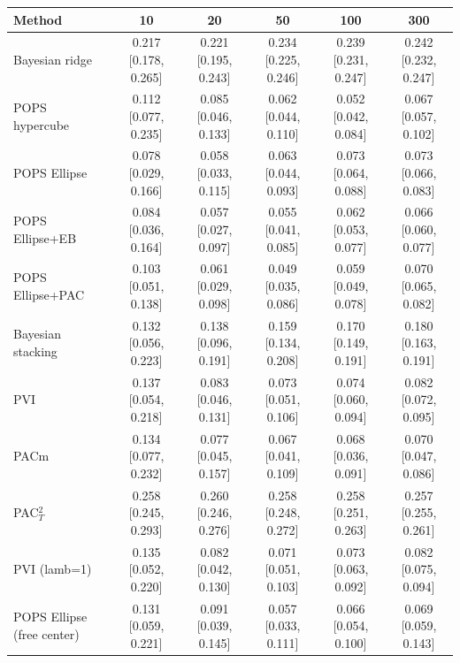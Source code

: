 \begin{tabular}{lccccc}
\toprule
Method & 10 & 20 & 50 & 100 & 300 \\
\midrule
Bayesian ridge & 0.217 {\scriptsize[0.178, 0.265]} & 0.221 {\scriptsize[0.195, 0.243]} & 0.234 {\scriptsize[0.225, 0.246]} & 0.239 {\scriptsize[0.231, 0.247]} & 0.242 {\scriptsize[0.232, 0.247]} \\
POPS hypercube & 0.112 {\scriptsize[0.077, 0.235]} & 0.085 {\scriptsize[0.046, 0.133]} & 0.062 {\scriptsize[0.044, 0.110]} & 0.052 {\scriptsize[0.042, 0.084]} & 0.067 {\scriptsize[0.057, 0.102]} \\
POPS Ellipse & 0.078 {\scriptsize[0.029, 0.166]} & 0.058 {\scriptsize[0.033, 0.115]} & 0.063 {\scriptsize[0.044, 0.093]} & 0.073 {\scriptsize[0.064, 0.088]} & 0.073 {\scriptsize[0.066, 0.083]} \\
POPS Ellipse+EB & 0.084 {\scriptsize[0.036, 0.164]} & 0.057 {\scriptsize[0.027, 0.097]} & 0.055 {\scriptsize[0.041, 0.085]} & 0.062 {\scriptsize[0.053, 0.077]} & 0.066 {\scriptsize[0.060, 0.077]} \\
POPS Ellipse+PAC & 0.103 {\scriptsize[0.051, 0.138]} & 0.061 {\scriptsize[0.029, 0.098]} & 0.049 {\scriptsize[0.035, 0.086]} & 0.059 {\scriptsize[0.049, 0.078]} & 0.070 {\scriptsize[0.065, 0.082]} \\
Bayesian stacking & 0.132 {\scriptsize[0.056, 0.223]} & 0.138 {\scriptsize[0.096, 0.191]} & 0.159 {\scriptsize[0.134, 0.208]} & 0.170 {\scriptsize[0.149, 0.191]} & 0.180 {\scriptsize[0.163, 0.191]} \\
PVI & 0.137 {\scriptsize[0.054, 0.218]} & 0.083 {\scriptsize[0.046, 0.131]} & 0.073 {\scriptsize[0.051, 0.106]} & 0.074 {\scriptsize[0.060, 0.094]} & 0.082 {\scriptsize[0.072, 0.095]} \\
PACm & 0.134 {\scriptsize[0.077, 0.232]} & 0.077 {\scriptsize[0.045, 0.157]} & 0.067 {\scriptsize[0.041, 0.109]} & 0.068 {\scriptsize[0.036, 0.091]} & 0.070 {\scriptsize[0.047, 0.086]} \\
PAC$^2_T$ & 0.258 {\scriptsize[0.245, 0.293]} & 0.260 {\scriptsize[0.246, 0.276]} & 0.258 {\scriptsize[0.248, 0.272]} & 0.258 {\scriptsize[0.251, 0.263]} & 0.257 {\scriptsize[0.255, 0.261]} \\
PVI (lamb=1) & 0.135 {\scriptsize[0.052, 0.220]} & 0.082 {\scriptsize[0.042, 0.130]} & 0.071 {\scriptsize[0.051, 0.103]} & 0.073 {\scriptsize[0.063, 0.092]} & 0.082 {\scriptsize[0.075, 0.094]} \\
POPS Ellipse (free center) & 0.131 {\scriptsize[0.059, 0.221]} & 0.091 {\scriptsize[0.039, 0.145]} & 0.057 {\scriptsize[0.033, 0.111]} & 0.066 {\scriptsize[0.054, 0.100]} & 0.069 {\scriptsize[0.059, 0.143]} \\

\end{tabular}
